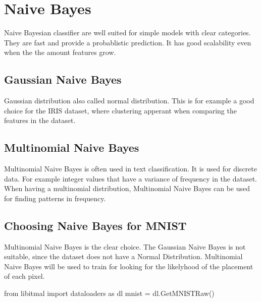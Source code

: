 \documentclass{article}
\begin{document}
\section{Naive Bayes}

Naive Bayesian classifier are well suited for simple models with clear categories. They are fast and provide a probablistic prediction. It has good scalability even when the the amount features grow.

\subsection{Gaussian Naive Bayes}

Gaussian distribution also called normal distribution. This is for example a good choice for the IRIS dataset, where clustering apperant when comparing the features in the dataset. 

\subsection{Multinomial Naive Bayes}
Multinomial Naive Bayes is often used in text classification. It is used for discrete data. For example integer values that have a variance of frequency in the dataset.
When having a multinomial distribution, Multinomial Naive Bayes can be used for finding patterns in frequency.

\subsection{Choosing Naive Bayes for MNIST}
Multinomial Naive Bayes is the clear choice. The Gaussian Naive Bayes is not suitable, since the dataset does not have a Normal Distribution. Multinomial Naive Bayes will be used to train for looking for the likelyhood of the placement of each pixel. 

\begin{pyminted}
from libitmal import dataloaders as dl
mnist = dl.GetMNISTRaw()
\end{pyminted}
\end{document}

